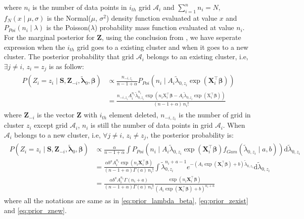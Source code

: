 \documentclass[12pt]{article}
\newcommand{\dd}{\mathrm{d}}
\begin{document}
where $n_i$ is the number of data points in $i_{th}$ grid
$\mathcal{A}_i$ and $\sum_{i=1}^n n_i = N$,
$f_{N}(x\mid \mu, \sigma)$ is the Normal($\mu$, $\sigma^2$)
density function evaluated at value $x$ and $P_{Poi}(n_i\mid\lambda)$
is the Poisson($\lambda$) probability mass function evaluated at value
$n_i$. For the marginal posterior for $\mathbf{Z}$, using the
conclusion from \cite{neal2000markov}, we have seperate expression
when the $i_{th}$ grid goes to a existing cluster and when it goes to
a new cluster. The posterior probability that grid $\mathcal{A}_i$
belongs to an existing cluster, i.e, $\exists j \ne i,\, z_i =
z_j$ is as follow:
\begin{align}\label{eq:prior_zexist}
  \begin{split}
    P\left(Z_i = z_i \mid \mathbf{S}, \mathbf{Z}_{-i},
      \tilde{\bm{\lambda}}_0, \bm{\beta}\right) &\propto \frac{n_{-i,
        z_i}}{n-1+\alpha} P_{Poi}\left(n_i\mid A_i\tilde{\lambda}_{0,
        z_i}\exp(\mathbf{X}_i^\top\bm{\beta}) \right)\\
    &= \frac{n_{-i, z_i} A_i^{n_i}\tilde{\lambda}_{0, z_i}^{n_i}
      \exp\left(n_i\mathrm{X}_i^\top\bm{\beta} -
        A_i\tilde{\lambda}_{0, z_i}\exp(\mathrm{X}_i^\top\bm{\beta})\right)}{(n-1+\alpha)\,n_i!}
  \end{split}
\end{align}
where $\mathbf{Z}_{-i}$ is the vector $\mathbf{Z}$ with $i_{th}$
element deleted, $n_{-i, z_i}$ is the number of grid in cluster $z_i$
except grid $\mathcal{A}_i$, $n_i$ is still the number of data points
in grid $\mathcal{A}_i$. When $\mathcal{A}_i$ belongs to a new
cluster, i.e, $\forall j\ne i,\, z_i \ne z_j$, the posterior
probability is:
\begin{align}\label{eq:prior_znew}
  \begin{split}
    P\left(Z_i = z_i\mid \mathbf{S}, \mathbf{Z}_{-i},
      \tilde{\bm{\lambda}}_0, \bm{\beta}\right) &\propto
    \frac{\alpha}{n-1+\alpha} \int P_{Poi}\left(n_i\mid
      A_i\tilde{\lambda}_{0,
        z_i}\exp(\mathbf{X}_i^\top\bm{\beta})f_{Gam}(\tilde{\lambda}_{0,
        z_i}\mid a, b)\right)\dd \tilde{\lambda}_{0, z_i}\\
    &= \frac{\alpha b^a A_i^{n_i}\exp(n_i\mathbf{X}_i^\top
      \bm{\beta})}{(n-1+\alpha) \Gamma(a)\, n_i!}\int
    \tilde{\lambda}_{0,
      z_i}^{n_i+a-1}e^{-\left(A_i\exp(\mathbf{X}_i^\top
        \bm{\beta})+b\right)\tilde{\lambda}_{0, z_i}} \dd
    \tilde{\lambda}_{0, z_i}\\
    &= \frac{\alpha b^a
      A_i^{n_i}\Gamma(n_i+a)}{(n-1+\alpha)\Gamma(a)\,
      n_i!}\frac{\exp(n_i \mathbf{X}_i^\top \bm{\beta})}{\left(A_i
        \exp(\mathbf{X}_i^\top \bm{\beta})+b\right)^{n_i+a}}
  \end{split}
\end{align}
where all the notations are same as in \eqref{eq:prior_lambda_beta},
\eqref{eq:prior_zexist} and \eqref{eq:prior_znew}.
\end{document}
